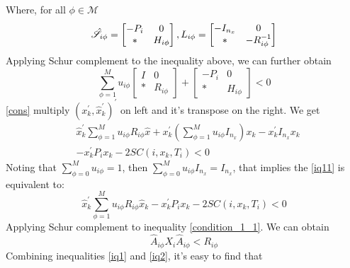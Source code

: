 \documentclass[conference]{IEEEtran}
\begin{document}
Where, for all $\phi\in\mathcal{M}$
\begin{equation} \notag
	\begin{aligned}
		\hat{\mathscr{S}}_{i\phi}=\begin{bmatrix}
			-P_{i }&0\\
			*&H_{i\phi}
		\end{bmatrix},
		L_{i\phi} = \begin{bmatrix}
			-I_{n_x}&0\\
			*&-R^{-1}_{i\phi}
		\end{bmatrix}
	\end{aligned}
\end{equation}
Applying Schur complement to the inequality above, we can further obtain \\
\begin{equation} \label{cons}
\sum_{\phi=1}^{M}u_{i\phi} \begin{bmatrix}
I&0\\
*&R_{i\phi}
\end{bmatrix} + \begin{bmatrix}
-P_{i }&0\\
*&H_{i\phi}
\end{bmatrix} <0
\end{equation}
\eqref{cons} multiply $(x^{'}_k,\hat{x}^{'}_{k})^{'}$ on left and it's transpose on the right. We get\\
\begin{equation} \label{iq11}
	\begin{split}
		&\hat{x}^{'}_{k}\sum_{\phi=1}^{M}u_{i\phi}R_{i\phi}\hat{x}+x^{'}_{k}(\sum_{\phi=1}^{M}u_{i\phi}I_{n_x})x_{k}-x^{'}_{k}I_{n_x}x_{k}\\
		&-x^{'}_{k}P_{i}x_{k}-2SC(i,x_k,T_i)<0
	\end{split}
\end{equation}
Noting that $\sum_{\phi=0}^{M}u_{i\phi}=1$, then $\sum_{\phi=0}^{M}u_{i\phi}I_{n_x}=I_{n_x}$, that implies the \eqref{iq11} is equivalent to:
\begin{equation} \label{iq1}
\hat{x}^{'}_{k}\sum_{\phi=1}^{M}u_{i\phi}R_{i\phi}\hat{x}_k-x^{'}_{k}P_{i}x_{k}-2SC(i,x_k,T_i)<0
\end{equation}
Applying Schur complement to inequality \eqref{condition_1_1}. We can obtain \\
\begin{equation} \label{iq2}
\hat{A}_{i\phi}X_{i}\hat{A}_{i\phi}<R_{i\phi}
\end{equation}
Combining inequalities \eqref{iq1} and \eqref{iq2}, it's easy to find that \\
\end{document}
